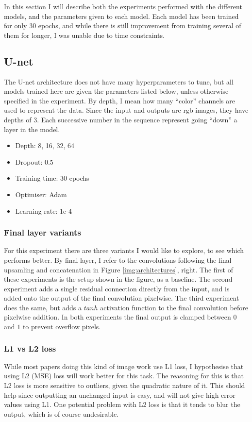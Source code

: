 In this section I will describe both the experiments performed with the different models, and the parameters given to each model. Each model has been trained for only 30 epochs, and while there is still improvement from training several of them for longer, I was unable due to time constraints.
\subsection{U-net}
The U-net architecture does not have many hyperparameters to tune, but all models trained here are given the parameters listed below, unless otherwise specified in the experiment. By depth, I mean how many ``color'' channels are used to represent the data. Since the input and outputs are rgb images, they have depths of 3. Each successive number in the sequence represent going ``down'' a layer in the model.
\begin{itemize}
\item Depth: 8, 16, 32, 64
\item Dropout: 0.5
\item Training time: 30 epochs
\item Optimiser: Adam
\item Learning rate: 1e-4
\end{itemize}

\subsubsection{Final layer variants}
For this experiment there are three variants I would like to explore, to see which performs better. By final layer, I refer to the convolutions following the final upsamling and concatenation in Figure \ref{img:architectures}, right. The first of these experiments is the setup shown in the figure, as a baseline. The second experiment adds a single residual connection directly from the input, and is added onto the output of the final convolution pixelwise. The third experiment does the same, but adds a $tanh$ activation function to the final convolution before pixelwise addition. In both experiments the final output is clamped between $0$ and $1$ to prevent overflow pixels.

\subsubsection{L1 vs L2 loss}
While most papers doing this kind of image work use L1 loss, I hypothesise that using L2 (MSE) loss will work better for this task. The reasoning for this is that L2 loss is more sensitive to outliers, given the quadratic nature of it. This should help since outputting an unchanged input is easy, and will not give high error values using L1. One potential problem with L2 loss is that it tends to blur the output, which is of course undesirable.

